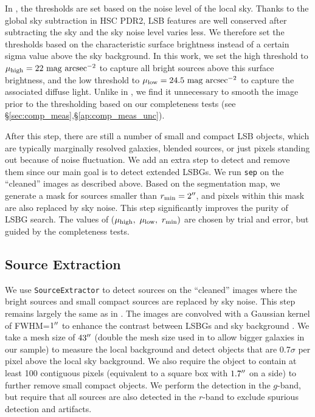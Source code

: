\documentclass[twocolumn,astrosymb,twocolappendix]{aastex631}
\newcommand{\sbunit}{\mathrm{mag\ arcsec}^{-2}}
\newcommand{\code}[1]{\texttt{#1}}
\begin{document}
\begin{CJK*}{UTF8}{gbsn}
In , the thresholds are set based on the noise level of the local sky. Thanks to the global sky subtraction in HSC PDR2, LSB features are well conserved after subtracting the sky and the sky noise level varies less. We therefore set the thresholds based on the characteristic surface brightness instead of a certain sigma value above the sky background. In this work, we set the high threshold to $\mu_{\rm high} = 22\ \sbunit$ to capture all bright sources above this surface brightness, and the low threshold to $\mu_{\rm low} = 24.5\ \sbunit$ to capture the associated diffuse light. Unlike in , we find it unnecessary to smooth the image prior to the thresholding based on our completeness tests (see \S \ref{sec:comp_meas},\S\ref{ap:comp_meas_unc}).   

After this step, there are still a number of small and compact LSB objects, which are typically marginally resolved galaxies, blended sources, or just pixels standing out because of noise fluctuation. We add an extra step to detect and remove them since our main goal is to detect extended LSBGs. We run \code{sep} on the ``cleaned'' images as described above. Based on the segmentation map, we generate a mask for sources smaller than $r_{\rm min} = 2\mbox{$^{\prime\prime}$}$, and pixels within this mask are also replaced by sky noise. This step significantly improves the purity of LSBG search. The values of ($\mu_{\rm high},\ \mu_{\rm low},\ r_{\rm min})$ are chosen by trial and error, but guided by the completeness tests. 
    
\subsection{Source Extraction}
We use \code{SourceExtractor} to detect sources on the ``cleaned'' images where the bright sources and small compact sources are replaced by sky noise. This step remains largely the same as in . The images are convolved with a Gaussian kernel of FWHM=$1\mbox{$^{\prime\prime}$}$ to enhance the contrast between LSBGs and sky background \citep[e.g.,][]{Irwin1985,Akhlaghi2015,Greco2018}. We take a mesh size of $43\mbox{$^{\prime\prime}$}$ (double the mesh size used in  to allow bigger galaxies in our sample) to measure the local background and detect objects that are 0.7$\sigma$ per pixel above the local sky background. We also require the object to contain at least 100 contiguous pixels (equivalent to a square box with $1.7\mbox{$^{\prime\prime}$}$ on a side) to further remove small compact objects. We perform the detection in the $g$-band, but require that all sources are also detected in the $r$-band to exclude spurious detection and artifacts.
    

\end{CJK*}
\end{document}
